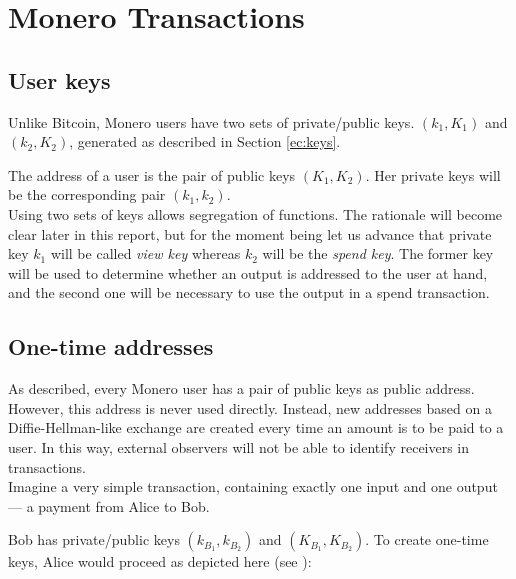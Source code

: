 

\chapter{Monero Transactions}
\label{chapter:transactions}

\section{User keys}

Unlike Bitcoin, Monero users have two sets of private/public keys. 
\((k_1, K_1)\) and \( (k_2, K_2) \), generated as described in Section \ref{ec:keys}.

The address of a user is the pair of public keys \((K_1, K_2)\). Her private keys will be the corresponding pair \( (k_1, k_2) \).
\\

Using two sets of keys allows segregation of functions. The rationale will become clear later in this 
report, but for the moment being let us advance that private key \(k_1\) will be called {\em view key} 
whereas \(k_2\) will be the {\em spend key}. The former key will be used to determine whether an output is
addressed to the user at hand, and the second one will be necessary to use the output in a spend
transaction. 




\section{One-time addresses}
\label{sec:one-time-addresses}

As described, every Monero user has a pair of public keys as public address. 
However, this address is never used directly.
Instead, new addresses based on a Diffie-Hellman-like exchange are created every time an amount is to be paid to a user.
In this way, external observers will not be able to identify receivers in transactions.
\\

Imagine a very simple transaction, containing exactly one input and one output --- a payment from Alice to Bob.

Bob has private/public keys \((k_{B_1}, k_{B_2})\) and \((K_{B_1}, K_{B_2})\).
To create one-time keys, Alice would proceed as depicted here (see \cite{cryptoNoteWhitePaper}):


